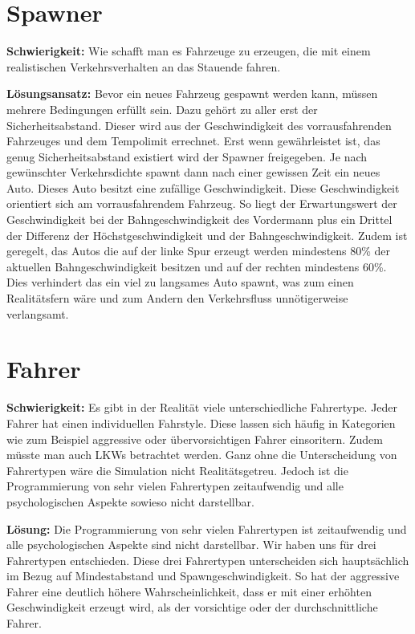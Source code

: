 \section{Spawner}
\textbf{Schwierigkeit:} Wie schafft man es Fahrzeuge zu erzeugen, die mit einem realistischen Verkehrsverhalten an das Stauende fahren.
\begin{addmargin}[25pt]{0pt}
	\item \textbf{Lösungsansatz:} Bevor ein neues Fahrzeug gespawnt werden kann, müssen mehrere Bedingungen erfüllt sein. Dazu gehört zu aller erst der Sicherheitsabstand. Dieser wird aus der Geschwindigkeit des vorrausfahrenden Fahrzeuges und dem Tempolimit errechnet. Erst wenn gewährleistet ist, das genug Sicherheitsabstand existiert wird der Spawner freigegeben. Je nach gewünschter Verkehrsdichte spawnt dann nach einer gewissen Zeit ein neues Auto. Dieses Auto besitzt eine zufällige Geschwindigkeit. Diese Geschwindigkeit orientiert sich am vorrausfahrendem Fahrzeug. So liegt der Erwartungswert der Geschwindigkeit bei der Bahngeschwindigkeit des Vordermann plus ein Drittel der Differenz der Höchstgeschwindigkeit und der Bahngeschwindigkeit. Zudem ist geregelt, das Autos die auf der linke Spur erzeugt werden mindestens 80\% der aktuellen Bahngeschwindigkeit besitzen und auf der rechten mindestens 60\%. Dies verhindert das ein viel zu langsames Auto spawnt, was zum einen Realitätsfern wäre und zum Andern den Verkehrsfluss unnötigerweise verlangsamt.\\
\end{addmargin}

\section{Fahrer}
\textbf{Schwierigkeit:} Es gibt in der Realität viele unterschiedliche Fahrertype. Jeder Fahrer hat einen individuellen Fahrstyle. Diese lassen sich häufig in Kategorien wie zum Beispiel aggressive oder übervorsichtigen Fahrer einsoritern. Zudem müsste man auch LKWs betrachtet werden. Ganz ohne die Unterscheidung von Fahrertypen wäre die Simulation nicht Realitätsgetreu. Jedoch ist die Programmierung von sehr vielen Fahrertypen zeitaufwendig und alle psychologischen Aspekte sowieso nicht darstellbar.
\begin{addmargin}[25pt]{0pt}
	\item \textbf{Lösung:} Die Programmierung von sehr vielen Fahrertypen ist zeitaufwendig und alle psychologischen Aspekte sind nicht darstellbar. Wir haben uns für drei Fahrertypen entschieden. Diese drei Fahrertypen unterscheiden sich hauptsächlich im Bezug auf Mindestabstand und Spawngeschwindigkeit. So hat der aggressive Fahrer eine deutlich höhere Wahrscheinlichkeit, dass er mit einer erhöhten Geschwindigkeit erzeugt wird, als der vorsichtige oder der durchschnittliche Fahrer.\\
\end{addmargin}